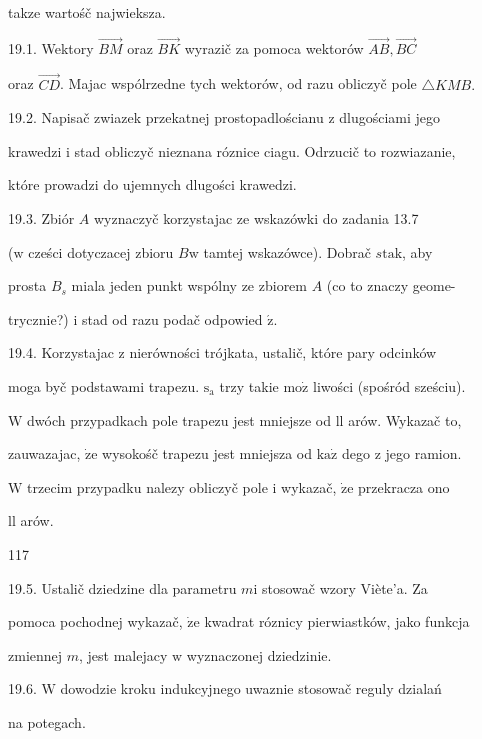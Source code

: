\documentclass[a4paper,12pt]{article}
\begin{document}
takze wartośč najwieksza.

19.1. Wektory $\vec{BM}$ oraz $\vec{BK}$ wyrazič za pomoca wektorów $\vec{AB}, \vec{BC}$

oraz $\vec{CD}$. Majac wspólrzedne tych wektorów, od razu obliczyč pole $\triangle KMB.$

19.2. Napisač zwiazek przekatnej prostopadlościanu $\mathrm{z}$ dlugościami jego

krawedzi $\mathrm{i}$ stad obliczyč nieznana róznice ciagu. Odrzucič to rozwiazanie,

które prowadzi do ujemnych dlugości krawedzi.

19.3. Zbiór $A$ wyznaczyč korzystajac ze wskazówki do zadania 13.7

($\mathrm{w}$ cześci dotyczacej zbioru $B \mathrm{w}$ tamtej wskazówce). Dobrač $s \mathrm{t}\mathrm{a}\mathrm{k}$, aby

prosta $B_{s}$ miala jeden punkt wspólny ze zbiorem $A$ (co to znaczy geome-

trycznie?) $\mathrm{i}$ stad od razu podač odpowied $\acute{\mathrm{z}}.$

19.4. Korzystajac $\mathrm{z}$ nierówności trójkata, ustalič, które pary odcinków

moga byč podstawami trapezu. $\mathrm{s}_{\mathrm{a}}$ trzy takie $\mathrm{m}\mathrm{o}\dot{\mathrm{z}}$ liwości (spośród sześciu).

$\mathrm{W}$ dwóch przypadkach pole trapezu jest mniejsze od ll arów. Wykazač to,

zauwazajac, $\dot{\mathrm{z}}\mathrm{e}$ wysokośč trapezu jest mniejsza od $\mathrm{k}\mathrm{a}\dot{\mathrm{z}}$ dego $\mathrm{z}$ jego ramion.

$\mathrm{W}$ trzecim przypadku nalezy obliczyč pole $\mathrm{i}$ wykazač, $\dot{\mathrm{z}}\mathrm{e}$ przekracza ono

ll arów.





117

19.5. Ustalič dziedzine dla parametru $m\mathrm{i}$ stosowač wzory Viète'a. Za

pomoca pochodnej wykazač, $\dot{\mathrm{z}}\mathrm{e}$ kwadrat róznicy pierwiastków, jako funkcja

zmiennej $m$, jest malejacy $\mathrm{w}$ wyznaczonej dziedzinie.

19.6. $\mathrm{W}$ dowodzie kroku indukcyjnego uwaznie stosowač reguly dzialań

na potegach.
\end{document}
